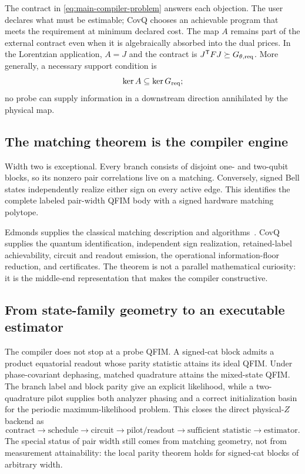 \documentclass[11pt]{article}
\theoremstyle{definition}
\theoremstyle{remark}
\begin{document}
The contract in \cref{eq:main-compiler-problem} answers each objection. The user declares what must be estimable; CovQ chooses an achievable program that meets the requirement at minimum declared cost. The map $A$ remains part of the external contract even when it is algebraically absorbed into the dual prices. In the Lorentzian application, $A=J$ and the contract is $J^{\mathsf T}FJ\succeq G_{\theta,{\rm req}}$. More generally, a necessary support condition is
\begin{equation}
  \ker A\subseteq\ker G_{\rm req};
  \label{eq:downstream-support-condition-intro}
\end{equation}
no probe can supply information in a downstream direction annihilated by the physical map.

\subsection{The matching theorem is the compiler engine}
Width two is exceptional. Every branch consists of disjoint one- and two-qubit blocks, so its nonzero pair correlations live on a matching. Conversely, signed Bell states independently realize either sign on every active edge. This identifies the complete labeled pair-width QFIM body with a signed hardware matching polytope.

Edmonds supplies the classical matching description and algorithms~\cite{Edmonds1965,Schrijver2003}. CovQ supplies the quantum identification, independent sign realization, retained-label achievability, circuit and readout emission, the operational information-floor reduction, and certificates. The theorem is not a parallel mathematical curiosity: it is the middle-end representation that makes the compiler constructive.

\subsection{From state-family geometry to an executable estimator}
The compiler does not stop at a probe QFIM. A signed-cat block admits a product equatorial readout whose parity statistic attains its ideal QFIM. Under phase-covariant dephasing, matched quadrature attains the mixed-state QFIM. The branch label and block parity give an explicit likelihood, while a two-quadrature pilot supplies both analyzer phasing and a correct initialization basin for the periodic maximum-likelihood problem. This closes the direct physical-$Z$ backend as
\[
\text{contract}\rightarrow\text{schedule}\rightarrow\text{circuit}
\rightarrow\text{pilot/readout}\rightarrow\text{sufficient statistic}\rightarrow\text{estimator}.
\]
The special status of pair width still comes from matching geometry, not from measurement attainability: the local parity theorem holds for signed-cat blocks of arbitrary width.
\end{document}
